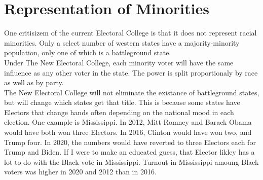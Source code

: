 \documentclass{article}
\begin{document}
    \section{Representation of Minorities}%

    One critisizem of the current Electoral College is that it does not represent racial minorities. Only a select number of western states have a majority-minority population, only one of which is a battleground state.\\

    Under The New Electoral College, each minority voter will have the same influence as any other voter in the state. The power is split proportionaly by race as well as by party.\\

    The New Electoral College will not eliminate the existance of battleground states, but will change which states get that title. This is because some states have Electors that change hands often depending on the national mood in each election. One example is Mississippi. In 2012, Mitt Romney and Barack Obama would have both won three Electors. In 2016, Clinton would have won two, and Trump four. In 2020, the numbers would have reverted to three Electors each for Trump and Biden. If I were to make an educated guess, that Elector likley has a lot to do with the Black vote in Mississippi. Turnout in Mississippi amoung Black voters was higher in 2020 and 2012 than in 2016.\\
\end{document}

